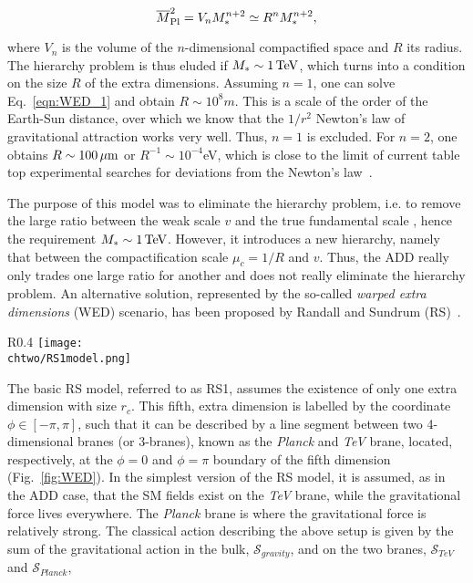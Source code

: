 \begin{equation}\label{eqn:WED_1}
\overline{M}_\mathrm{Pl}^2 = V_nM^{n+2}_* \simeq R^nM^{n+2}_*,
\end{equation}

\noindent where $V_n$ is the volume of the $n$-dimensional compactified space and $R$ its radius.
The hierarchy problem is thus eluded if $M_* \sim 1\,\text{Te\hspace{-.08em}V}$, which turns into a condition on the size $R$ of the extra dimensions.
Assuming $n = 1$, one can solve Eq.~\ref{eqn:WED_1} and obtain $R \sim 10^8\unit{m}$.
This is a scale of the order of the Earth-Sun distance, over which we know that the $1/r^2$ Newton's law of gravitational attraction works very well. Thus, $n = 1$ is excluded.
For $n = 2$, one obtains $R \sim 100\,\mu\text{m}$ or $R^{-1} \sim 10^{-4}$\unit{eV}, which is close to the limit of current table top experimental searches for deviations from the Newton's law~\cite{Hoyle:2004cw}. 

The purpose of this model was to eliminate the hierarchy problem, i.e. to remove the large ratio between the weak scale $v$ and the true fundamental scale \bMPl, hence the requirement $M_* \sim 1\,\text{Te\hspace{-.08em}V}$.
However, it introduces a new hierarchy, namely that between the compactification scale $\mu_c = 1/R$ and $v$.
Thus, the ADD really only trades one large ratio for another and does not really eliminate the hierarchy problem.
An alternative solution, represented by the so-called \textit{warped extra dimensions} (WED) scenario, has been proposed by Randall and Sundrum (RS)~\cite{Randall:1999ee}.

\begin{wrapfigure}{R}{0.4\textwidth}
 \centering
 \texttt{[image: \\chtwo/RS1model.png]}
 \caption{Setup of the five dimensions in the RS1 model. The \textit{Planck} and \textit{TeV} branes are the 4-dimensional boundaries of the extra dimension $\phi$ compactified in an interval $[0,\pi]$.}
 \label{fig:WED}
\end{wrapfigure}

The basic RS model, referred to as RS1, assumes the existence of only one extra dimension with size $r_c$. This fifth, extra dimension is labelled by the coordinate $\phi \in [-\pi,\pi]$,
such that it can be described by a line segment between two 4-dimensional branes (or 3-branes), known as the \textit{Planck} and \textit{TeV} brane, located, respectively,
at the $\phi = 0$ and $\phi = \pi$ boundary of the fifth dimension (Fig.~\ref{fig:WED}).
In the simplest version of the RS model, it is assumed, as in the ADD case, that the SM fields exist on the \textit{TeV} brane, while the gravitational force lives everywhere.
The \textit{Planck} brane is where the gravitational force is relatively strong.
The classical action describing the above setup is given by the sum of the gravitational action in the bulk, $\mathcal{S}_{gravity}$, and on the two branes, $\mathcal{S}_{TeV}$ and $\mathcal{S}_{Planck}$,

